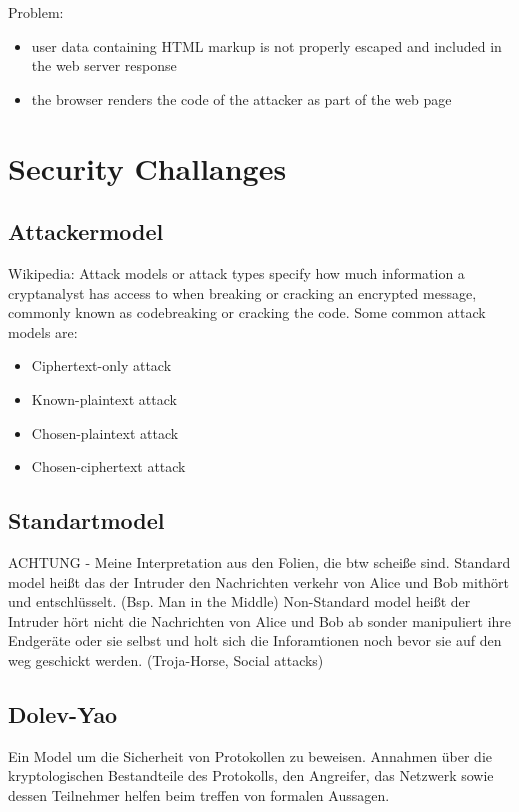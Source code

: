\documentclass[a4paper, 12pt]{article}
\begin{document}
Problem:
\begin{itemize}
\item user data containing HTML markup is not properly escaped and included in the web server response
\item the browser renders the code of the attacker as part of the web page
\end{itemize}

\section{Security Challanges}
\subsection{Attackermodel}
Wikipedia: Attack models or attack types specify how much information a cryptanalyst has access to when breaking or cracking an encrypted message, commonly known as codebreaking or cracking the code. 
\large Some common attack models are:
\begin{itemize}
	\item Ciphertext-only attack
	\item Known-plaintext attack
	\item Chosen-plaintext attack
	\item Chosen-ciphertext attack
\end{itemize}
\subsection{Standartmodel}
ACHTUNG - Meine Interpretation aus den Folien, die btw scheiße sind.
Standard model heißt das der Intruder den Nachrichten verkehr von Alice und Bob mithört und entschlüsselt. (Bsp. Man in the Middle)
Non-Standard model heißt der Intruder hört nicht die Nachrichten von Alice und Bob ab sonder manipuliert ihre Endgeräte oder sie selbst und holt sich die Inforamtionen noch bevor sie auf den weg geschickt werden. (Troja-Horse, Social attacks)
\subsection{Dolev-Yao}
Ein Model um die Sicherheit von Protokollen zu beweisen. Annahmen über die kryptologischen Bestandteile des Protokolls, den Angreifer, das Netzwerk sowie dessen Teilnehmer helfen beim treffen von formalen Aussagen.
\end{document}
